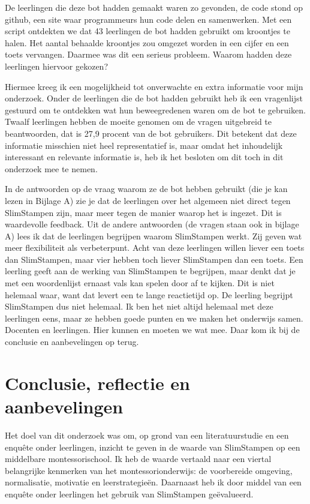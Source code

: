 \documentclass[12pt, a4paper]{article}
\begin{document}
De leerlingen die deze bot hadden gemaakt waren zo gevonden, de code stond op github, een site waar programmeurs hun code delen en samenwerken. Met een script ontdekten we dat 43 leerlingen de bot hadden gebruikt om kroontjes te halen. Het aantal behaalde kroontjes zou omgezet worden in een cijfer en een toets vervangen. Daarmee was dit een serieus probleem. Waarom hadden deze leerlingen hiervoor gekozen?

Hiermee kreeg ik een mogelijkheid tot onverwachte en extra informatie voor mijn onderzoek. Onder de leerlingen die de bot hadden gebruikt heb ik een vragenlijst gestuurd om te ontdekken wat hun beweegredenen waren om de bot te gebruiken. Twaalf leerlingen hebben de moeite genomen om de vragen uitgebreid te beantwoorden, dat is 27,9 procent van de bot gebruikers. Dit betekent dat deze informatie misschien niet heel representatief is, maar omdat het inhoudelijk interessant en relevante informatie is, heb ik het besloten om dit toch in dit onderzoek mee te nemen. 

In de antwoorden op de vraag waarom ze de bot hebben gebruikt (die je kan lezen in Bijlage A) zie je dat de leerlingen over het algemeen niet direct tegen SlimStampen zijn, maar meer tegen de manier waarop het is ingezet. Dit is waardevolle feedback. Uit de andere antwoorden (de vragen staan ook in bijlage A) lees ik dat de leerlingen begrijpen waarom SlimStampen werkt. Zij geven wat meer flexibiliteit als verbeterpunt. Acht van deze leerlingen willen liever een toets dan SlimStampen, maar vier hebben toch liever SlimStampen dan een toets. Een leerling geeft aan de werking van SlimStampen te begrijpen, maar denkt dat je met een woordenlijst ernaast vals kan spelen door af te kijken. Dit is niet helemaal waar, want dat levert een te lange reactietijd op. De leerling begrijpt SlimStampen dus niet helemaal. Ik ben het niet altijd helemaal met deze leerlingen eens, maar ze hebben goede punten en we maken het onderwijs samen. Docenten en leerlingen. Hier kunnen en moeten we wat mee. Daar kom ik bij de conclusie en aanbevelingen op terug.
\newpage
\section{Conclusie, reflectie en aanbevelingen}
Het doel van dit onderzoek was om, op grond van een literatuurstudie en een enquête onder leerlingen, inzicht te geven in de waarde van SlimStampen op een middelbare montessorischool. Ik heb de waarde vertaald naar een viertal belangrijke kenmerken van het montessorionderwijs: de voorbereide omgeving, normalisatie, motivatie en leerstrategieën. Daarnaast heb ik door middel van een enquête onder leerlingen het gebruik van SlimStampen geëvalueerd.
\end{document}
